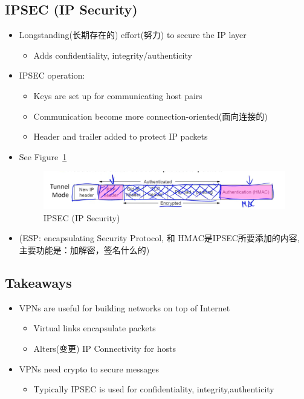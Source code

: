 \documentclass[12pt]{ctexart}   %
\begin{document}
	\subsection{IPSEC (IP Security)}
	\begin{itemize}
		\item Longstanding(长期存在的) effort(努力) to secure the IP layer
		\begin{itemize}
			\item Adds confidentiality, integrity/authenticity
		\end{itemize}

		\item IPSEC operation:
		\begin{itemize}
			\item Keys are set up for communicating host pairs 
			\item Communication become more connection-oriented(面向连接的)
			\item Header and trailer added to protect IP packets
		\end{itemize}
		\item See Figure~\ref{fig:10-8-7}
		  
		\begin{figure}[h!] %
		\centering
		\includegraphics[scale=0.7]{images/10-8-7}
		\caption{IPSEC (IP Security)}
		\label{fig:10-8-7}
		\end{figure}

		\item (ESP: encapsulating Security Protocol, 和 HMAC是IPSEC所要添加的内容, 主要功能是：加解密，签名什么的)
	\end{itemize}

	\subsection{Takeaways}
	\begin{itemize}
		\item VPNs are useful for building networks on top of Internet
		\begin{itemize}
			\item Virtual links encapsulate packets
			\item Alters(变更) IP Connectivity for hosts
		\end{itemize}

		\item VPNs need crypto to secure messages
		\begin{itemize}
			\item Typically IPSEC is used for confidentiality, integrity,authenticity
		\end{itemize}
	\end{itemize}
\end{document}

